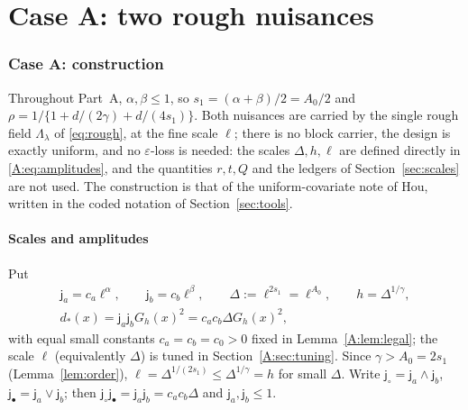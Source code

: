 \documentclass[11pt]{article}
\newcommand{\ja}{\mathsf{j}_a}
\newcommand{\jb}{\mathsf{j}_b}
\newcommand{\jsh}{\mathsf{j}_\circ}
\newcommand{\jfi}{\mathsf{j}_\bullet}
\begin{document}
\part{Case A: two rough nuisances}

\section{Case A: construction}\label{A:sec:construction}

Throughout Part~A, \(\alpha,\beta\le1\), so \(s_1=(\alpha+\beta)/2=A_0/2\)
and \(\rho=1/\{1+d/(2\gamma)+d/(4s_1)\}\).  Both nuisances are carried by
the single rough field \(\Lambda_\lambda\) of \eqref{eq:rough}, at the fine
scale \(\ell\); there is no block carrier, the design is exactly uniform,
and no \(\varepsilon\)-loss is needed: the scales \(\Delta,h,\ell\) are
defined directly in \eqref{A:eq:amplitudes}, and the quantities \(r,t,Q\)
and the ledgers of Section~\ref{sec:scales} are not used.  The
construction is that of the
uniform-covariate note of Hou, written in the coded notation of
Section~\ref{sec:tools}.

\subsection{Scales and amplitudes}
Put
\begin{equation}
 \begin{gathered}
  \ja=c_a\ell^\alpha,\qquad \jb=c_b\ell^\beta,\qquad
  \Delta:=\ell^{2s_1}=\ell^{A_0},\qquad h=\Delta^{1/\gamma},\\
  d_*(x)=\ja\jb G_h(x)^2=c_ac_b\Delta G_h(x)^2,
 \end{gathered}
 \label{A:eq:amplitudes}
\end{equation}
with equal small constants \(c_a=c_b=c_0>0\) fixed in
Lemma~\ref{A:lem:legal}; the
scale \(\ell\) (equivalently \(\Delta\)) is tuned in
Section~\ref{A:sec:tuning}.  Since \(\gamma>A_0=2s_1\) (Lemma~\ref{lem:order}),
\(\ell=\Delta^{1/(2s_1)}\le\Delta^{1/\gamma}=h\) for small \(\Delta\).  Write
\(\jsh=\ja\wedge\jb\), \(\jfi=\ja\vee\jb\); then \(\jsh\jfi=\ja\jb=c_ac_b\Delta\)
and \(\ja,\jb\le1\).
\end{document}
